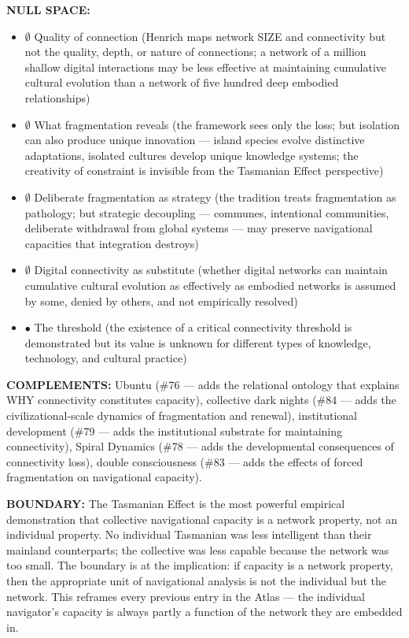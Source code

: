 \textbf{NULL SPACE:}

\begin{itemize}[nosep,leftmargin=*]
  \item $\emptyset$ Quality of connection (Henrich maps network SIZE and connectivity but not the quality, depth, or nature of connections; a network of a million shallow digital interactions may be less effective at maintaining cumulative cultural evolution than a network of five hundred deep embodied relationships)
  \item $\emptyset$ What fragmentation reveals (the framework sees only the loss; but isolation can also produce unique innovation — island species evolve distinctive adaptations, isolated cultures develop unique knowledge systems; the creativity of constraint is invisible from the Tasmanian Effect perspective)
  \item $\emptyset$ Deliberate fragmentation as strategy (the tradition treats fragmentation as pathology; but strategic decoupling — communes, intentional communities, deliberate withdrawal from global systems — may preserve navigational capacities that integration destroys)
  \item $\emptyset$ Digital connectivity as substitute (whether digital networks can maintain cumulative cultural evolution as effectively as embodied networks is assumed by some, denied by others, and not empirically resolved)
  \item $\bullet$ The threshold (the existence of a critical connectivity threshold is demonstrated but its value is unknown for different types of knowledge, technology, and cultural practice)
\end{itemize}


\textbf{COMPLEMENTS:} Ubuntu (\#76 — adds the relational ontology that explains WHY connectivity constitutes capacity), collective dark nights (\#84 — adds the civilizational-scale dynamics of fragmentation and renewal), institutional development (\#79 — adds the institutional substrate for maintaining connectivity), Spiral Dynamics (\#78 — adds the developmental consequences of connectivity loss), double consciousness (\#83 — adds the effects of forced fragmentation on navigational capacity).


\textbf{BOUNDARY:} The Tasmanian Effect is the most powerful empirical demonstration that collective navigational capacity is a network property, not an individual property. No individual Tasmanian was less intelligent than their mainland counterparts; the collective was less capable because the network was too small. The boundary is at the implication: if capacity is a network property, then the appropriate unit of navigational analysis is not the individual but the network. This reframes every previous entry in the Atlas — the individual navigator's capacity is always partly a function of the network they are embedded in.


